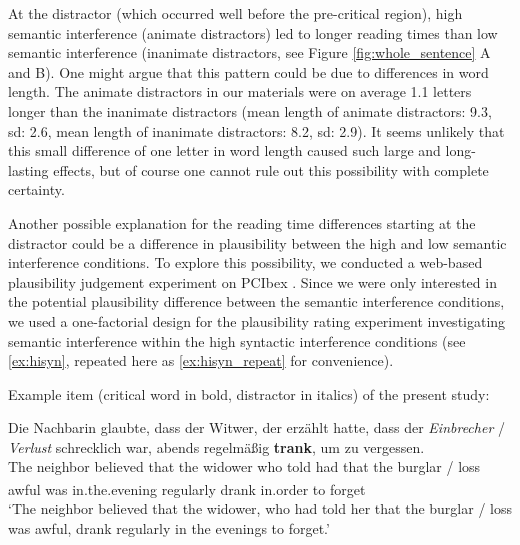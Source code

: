 \documentclass[review,preprint,12pt,authoryear,floatsintext]{elsarticle}
\begin{document}
At the distractor (which occurred well before the pre-critical region), high semantic interference (animate distractors) led to longer reading times than low semantic interference (inanimate distractors, see Figure \ref{fig:whole_sentence} A and B). One might argue that this pattern could be due to differences in word length. The animate distractors in our materials were on average 1.1 letters longer than the inanimate distractors (mean length of animate distractors: 9.3, sd: 2.6, mean length of inanimate distractors: 8.2, sd: 2.9). It seems unlikely that this small difference of one letter in word length caused such large and long-lasting effects, but of course one cannot rule out this possibility with complete certainty.

\label{plausib_anim_inan}{Another possible explanation for the reading time differences starting at the distractor could be a difference in plausibility between the high and low semantic interference conditions. To explore this possibility, we conducted a web-based plausibility judgement experiment on PCIbex  \citep{pcibex}. Since we were only interested in the potential plausibility difference between the semantic interference conditions, we used a one-factorial design for the plausibility rating experiment investigating semantic interference within the high syntactic interference conditions (see \ref{ex:hisyn}, repeated here as \ref{ex:hisyn_repeat} for convenience).

\begin{exe}  
\ex \label{ex:materials_repeat} Example item (critical word in bold, distractor in italics) of the present study:
    \begin{xlist}   
    \label{ex:hisyn_repeat} 
    \gll Die  Nachbarin glaubte,	dass	der Witwer,  der  erzählt hatte, dass der \textit{Einbrecher} / \textit{Verlust}  schrecklich war, abends regelmäßig \textbf{trank}, um zu vergessen.\\ 
    The\textsubscript{} neighbor\textsubscript{} believed that the widower who told had that the burglar / loss awful was in.the.evening regularly drank in.order to forget \\
    \trans `The neighbor believed that the widower, who had told her that the burglar / loss was awful, drank regularly in the evenings to forget.' \\
    \end{xlist}
\end{exe}

}
\end{document}

